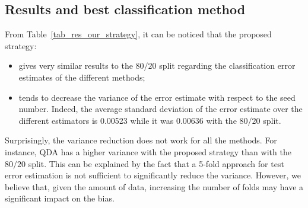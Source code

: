 \subsection{Results and best classification method}
From Table~\ref{tab_res_our_strategy}, it can be noticed that the proposed strategy:
\begin{itemize}
	\item gives very similar results to the $80/20$ split regarding the classification error estimates of the different methods;
 	\item tends to decrease the variance of the error estimate with respect to the seed number. Indeed, the average standard deviation of the error estimate over the different estimators is \num{0.00523} while it was \num{0.00636} with the $80/20$ split.
\end{itemize} 
Surprisingly, the variance reduction does not work for all the methods. For instance, QDA has a higher variance with the proposed strategy than with the $80/20$ split. 
This can be explained by the fact that a \num{5}-fold approach for test error estimation is not sufficient to significantly reduce the variance. However, we believe that, given the amount of data, increasing the number of folds may have a significant impact on the bias. 

